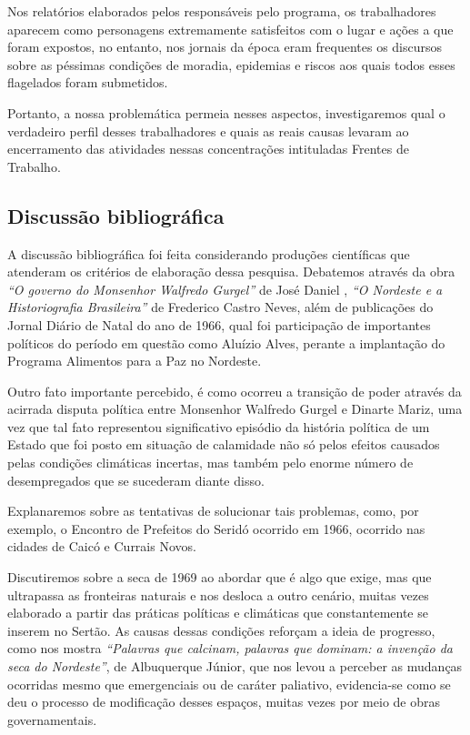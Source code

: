 \begin{refsection}
    Nos relatórios elaborados pelos responsáveis pelo programa, os trabalhadores aparecem como personagens extremamente satisfeitos com o lugar e ações a que foram expostos, no entanto, nos jornais da época eram frequentes os discursos sobre as péssimas condições de moradia, epidemias e riscos aos quais todos esses flagelados foram submetidos. 

    Portanto, a nossa problemática permeia nesses aspectos, investigaremos qual o verdadeiro perfil desses trabalhadores e quais as reais causas levaram ao encerramento das atividades nessas concentrações intituladas Frentes de Trabalho.

    \subsection{Discussão bibliográfica}

    A discussão bibliográfica foi feita considerando produções científicas que atenderam os critérios de elaboração dessa pesquisa. Debatemos através da obra \textit{``O governo do Monsenhor Walfredo Gurgel''} de José Daniel \textcite{Diniz2016Governo}, \textit{``O Nordeste e a Historiografia Brasileira''} \citeyear{Neves2012Nordeste} de Frederico Castro Neves, além de publicações do Jornal Diário de Natal do ano de 1966, qual foi participação de importantes políticos do período em questão como Aluízio Alves, perante a implantação do Programa Alimentos para a Paz no Nordeste.

    Outro fato importante percebido, é como ocorreu a transição de poder através da acirrada disputa política entre Monsenhor Walfredo Gurgel e Dinarte Mariz, uma vez que tal fato representou significativo episódio da história política de um Estado que foi posto em situação de calamidade não só pelos efeitos causados pelas condições climáticas incertas, mas também pelo enorme número de desempregados que se sucederam diante disso. 

    Explanaremos sobre as tentativas de solucionar tais problemas, como, por exemplo, o Encontro de Prefeitos do Seridó ocorrido em 1966, ocorrido nas cidades de Caicó e Currais Novos.  

    Discutiremos sobre a seca de 1969 ao abordar que é algo que exige, mas que ultrapassa as fronteiras naturais e nos desloca a outro cenário, muitas vezes elaborado a partir das práticas políticas e climáticas que constantemente se inserem no Sertão. As causas dessas condições reforçam a ideia de progresso, como nos mostra \textit{``Palavras que calcinam, palavras que dominam: a invenção da seca do Nordeste''}, \citeyear{AlbuquerqueJr1995Palavras} de Albuquerque Júnior, que nos levou a perceber as mudanças ocorridas mesmo que emergenciais ou de caráter paliativo, evidencia-se como se deu o processo de modificação desses espaços, muitas vezes por meio de obras governamentais. 


\end{refsection}
